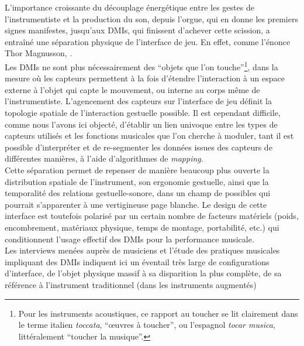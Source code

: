 \noindent L'importance croissante du découplage énergétique entre les gestes de l'instrumentiste et la production du son, depuis l'orgue, qui en donne les premiers signes manifestes, jusqu'aux \glspl{DMI}, qui finissent d'achever cette scission, a entraîné une séparation physique de l'interface de jeu. En effet, comme l'énonce Thor Magnusson, .\\
\indent Les \glspl{DMI} ne sont plus nécessairement des ``objets que l'on touche''\footnote{Pour les instruments acoustiques, ce rapport au toucher se lit clairement dans le terme italien \textit{toccata}, ``œuvres à toucher'', ou l'espagnol \textit{tocar musica}, littéralement ``toucher la musique''.}, dans la mesure où les capteurs permettent à la fois d'étendre l'interaction à un espace externe à l'objet qui capte le mouvement, ou interne au corps même de l'instrumentiste. L'agencement des capteurs sur l'interface de jeu définit la topologie spatiale de l'interaction gestuelle possible. Il est cependant difficile, comme nous l'avons ici objecté, d'établir un lien univoque entre les types de capteurs utilisés et les fonctions musicales que l'on cherche à moduler, tant il est possible d'interpréter et de re-segmenter les données issues des capteurs de différentes manières, à l'aide d'algorithmes de \textit{mapping}.\\
\indent Cette séparation permet de repenser de manière beaucoup plus ouverte la distribution spatiale de l'instrument, son ergonomie gestuelle, ainsi que la temporalité des relations gestuelle-sonore, dans un champ de possibles qui pourrait s'apparenter à une vertigineuse page blanche. Le design de cette interface est toutefois polarisé par un certain nombre de facteurs matériels (poids, encombrement, matériaux physique, temps de montage, portabilité, etc.) qui conditionnent l'usage effectif des \glspl{DMI} pour la performance musicale.\\
\indent Les interviews menées auprès de musiciens et l'étude des pratiques musicales impliquant des \glspl{DMI} indiquent ici un éventail très large de configurations d'interface, de l'objet physique massif à sa disparition la plus complète, de sa référence à l'instrument traditionnel (dans les instruments augmentés)
